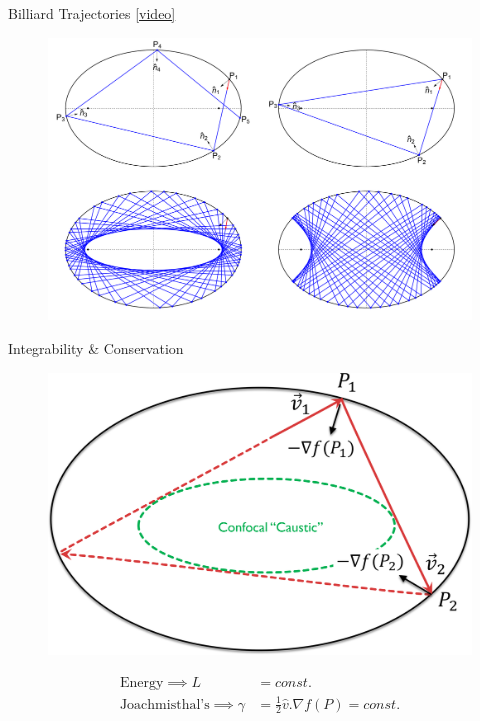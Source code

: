 \begin{frame}{Billiard Trajectories \href{https://youtu.be/A7mPzrNJHkA}{[video]}}
\begin{figure}
    \includegraphics[height=.8\textheight]{pics/1000_billiard_trajectories.pdf}
\end{figure}
\end{frame}

\begin{frame}{Integrability \& Conservation}
\begin{figure}
\includegraphics[height=.6\textheight]{pics/0000_integrability.png}
\end{figure}

\vspace*{-1cm}
\begin{align*}
\mbox{Energy} \implies L&=const.\\
\mbox{Joachmisthal's} \implies \gamma&=\frac{1}{2}\hat{v}.\nabla{f}(P)=const.
\end{align*}

\end{frame}

